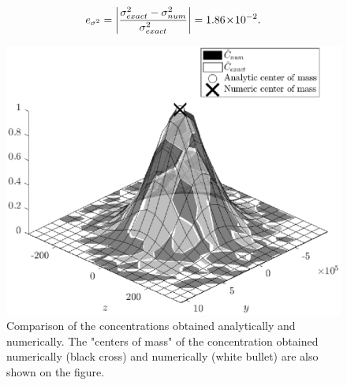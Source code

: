 \begin{equation}
	e_{\sigma^2} = \left \lvert \frac{\sigma^2_{exact}-\sigma^2_{num}}{\sigma^2_{exact}}\right \rvert = 1.86\!\times\!10^{-2}.
\end{equation}
\begin{figure}[H]
	\centering
	\includegraphics[width = \textwidth]{fig/testcase/testcase_surf.eps}
	\caption{Comparison of the concentrations obtained analytically and numerically. The "centers of mass" of the concentration obtained numerically (black cross) and numerically (white bullet) are also shown on the figure.}
	\label{fig:testcase_surf}
\end{figure}
